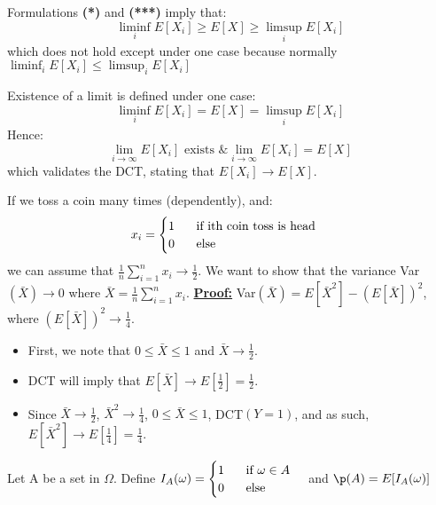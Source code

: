 Formulations \textbf{(*)} and \textbf{(***)} imply that:
\begin{equation*}
    \liminf_iE[X_i] \geq E[X] \geq \limsup_iE[X_i]
\end{equation*}
which does not hold except under one case because normally $\liminf_iE[X_i] \leq \limsup_iE[X_i]$
\begin{rem}
    Existence of a limit is defined under one case:
    \begin{equation}
        \liminf_iE[X_i] = E[X] = \limsup_iE[X_i]
    \end{equation}
    Hence:
    \begin{equation*}
        \lim_{i\rightarrow\infty}E[X_i] \text{ exists \& }\lim_{i\rightarrow\infty}E[X_i] = E[X]
    \end{equation*}
    which validates the DCT, stating that $E[X_i] \rightarrow E[X]$.
\end{rem}
\begin{exmp}
    If we toss a coin many times (dependently), and:
    \begin{equation*}
        x_i = \begin{cases}
            1 \hspace{0.5cm} \text{ if ith coin toss is head} \\
            0 \hspace{0.5cm} \text{ else}
        \end{cases}
    \end{equation*}
    we can assume that $\frac{1}{n}\sum_{i=1}^nx_i \rightarrow \frac{1}{2}$. We want to show that the variance Var$(\bar{X}) \rightarrow 0$ where $\bar{X} = \frac{1}{n}\sum_{i=1}^nx_i$.
    \textbf{\underline{Proof:}} Var$(\bar{X}) = E[\bar{X}^2] - (E[\bar{X}])^2$, where $(E[\bar{X}])^2 \rightarrow \frac{1}{4}$.
    \begin{itemize}
        \item First, we note that $0 \leq \bar{X} \leq 1$ and $\bar{X} \rightarrow \frac{1}{2}$.
        \item DCT will imply that $E[\bar{X}]\rightarrow E[\frac{1}{2}] = \frac{1}{2}$.
        \item Since $\bar{X} \rightarrow \frac{1}{2}$, $\bar{X}^2 \rightarrow \frac{1}{4}$, $0 \leq \bar{X} \leq 1$, DCT$(Y=1)$, and as such, $E[\bar{X}^2] \rightarrow E[\frac{1}{4}] = \frac{1}{4}$.
    \end{itemize}
\end{exmp}
\begin{defn}
    Let A be a set in $\Omega$. Define $I_A(\omega) = \begin{cases}
        1 \hspace{0.5cm} \text{ if } \omega \in A\\
        0 \hspace{0.5cm} \text{ else} 
    \end{cases}$ and $\p(A) = E[I_A(\omega)]$
\end{defn}

